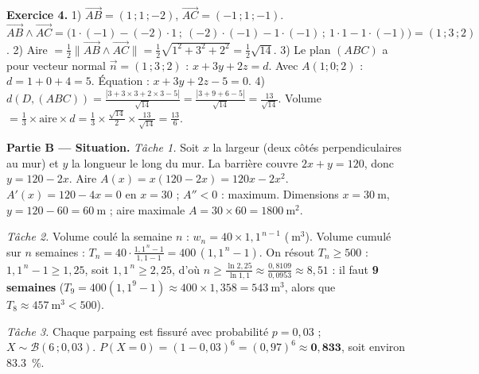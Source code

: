 \noindent\textbf{Exercice 4.}
1) $\vec{AB}=(1\,;1\,;-2)$, $\vec{AC}=(-1\,;1\,;-1)$.
$\vec{AB}\wedge\vec{AC}=\big(1\cdot(-1)-(-2)\cdot1\,;\ (-2)\cdot(-1)-1\cdot(-1)\,;\ 1\cdot1-1\cdot(-1)\big)=(1\,;3\,;2)$.
2) Aire $=\frac12\|\vec{AB}\wedge\vec{AC}\|=\frac12\sqrt{1^2+3^2+2^2}=\frac12\sqrt{14}$.
3) Le plan $(ABC)$ a pour vecteur normal $\vec n=(1\,;3\,;2)$ : $x+3y+2z=d$. Avec $A(1;0;2)$ :
$d=1+0+4=5$. Équation : $x+3y+2z-5=0$.
4) $d(D,(ABC))=\frac{|3+3\times3+2\times3-5|}{\sqrt{14}}=\frac{|3+9+6-5|}{\sqrt{14}}=\frac{13}{\sqrt{14}}$.
Volume $=\frac13\times\text{aire}\times d=\frac13\times\frac{\sqrt{14}}2\times\frac{13}{\sqrt{14}}=\frac{13}{6}$.

\smallskip
\noindent\textbf{Partie B — Situation.}
\emph{Tâche 1.} Soit $x$ la largeur (deux côtés perpendiculaires au mur) et $y$ la longueur le long
du mur. La barrière couvre $2x+y=120$, donc $y=120-2x$. Aire $A(x)=x(120-2x)=120x-2x^2$.
$A'(x)=120-4x=0$ en $x=30$ ; $A''<0$ : maximum. Dimensions $x=\SI{30}{\metre}$, $y=120-60=\SI{60}{\metre}$ ;
aire maximale $A=30\times60=\SI{1800}{\metre\squared}$.

\emph{Tâche 2.} Volume coulé la semaine $n$ : $w_n=40\times1{,}1^{\,n-1}$ ($\SI{}{\cubic\metre}$).
Volume cumulé sur $n$ semaines : $T_n=40\cdot\frac{1{,}1^{\,n}-1}{1{,}1-1}=400\,(1{,}1^{\,n}-1)$.
On résout $T_n\ge500$ : $1{,}1^{\,n}-1\ge1{,}25$, soit $1{,}1^{\,n}\ge2{,}25$, d'où
$n\ge\frac{\ln2{,}25}{\ln1{,}1}\approx\frac{0{,}8109}{0{,}0953}\approx8{,}51$ : il faut \textbf{9 semaines}
($T_9=400(1{,}1^9-1)\approx400\times1{,}358=\SI{543}{\cubic\metre}$, alors que $T_8\approx\SI{457}{\cubic\metre}<500$).

\emph{Tâche 3.} Chaque parpaing est fissuré avec probabilité $p=0{,}03$ ; $X\sim\mathcal B(6\,;0{,}03)$.
$P(X=0)=(1-0{,}03)^6=(0{,}97)^6\approx\mathbf{0{,}833}$, soit environ \SI{83,3}{\percent}.
